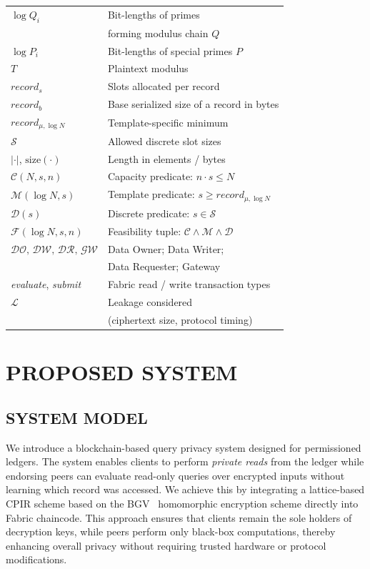 \documentclass[letterpaper,journal]{IEEEtran}
\begin{document}
\begin{table}[!htbp]
\begin{tabular}{|l|l|}
    \hline
    $\log Q_i$ & Bit-lengths of primes \\ & forming modulus chain $Q$ \\
    \hline
    $\log P_i$ & Bit-lengths of special primes $P$ \\
    \hline
    $T$ & Plaintext modulus \\
    \hline
    $record_s$ & Slots allocated per record \\
    \hline
    $record_b$ & Base serialized size of a record in bytes \\
    \hline
    $record_{\mu,\log N}$ & Template-specific minimum \\
    \hline
    $\mathcal{S}$ & Allowed discrete slot sizes \\
    \hline
    $|\cdot|$, $\mathrm{size}(\cdot)$ & Length in elements / bytes \\
    \hline
    $\mathcal{C}(N,s,n)$ & Capacity predicate: $n \cdot s \leq N$ \\
    \hline
    $\mathcal{M}(\log N,s)$ & Template predicate: $s \geq record_{\mu,\log N}$ \\
    \hline
    $\mathcal{D}(s)$ & Discrete predicate: $s \in \mathcal{S}$ \\
    \hline
    $\mathcal{F}(\log N,s,n)$ & Feasibility tuple: $\mathcal{C} \wedge \mathcal{M} \wedge \mathcal{D}$ \\
    \hline
    $\mathcal{DO},\,\mathcal{DW},\,\mathcal{DR},\,\mathcal{GW}$ & Data Owner; Data Writer; \\ & Data Requester; Gateway \\
    \hline
    \emph{evaluate}, \emph{submit} & Fabric read / write transaction types \\
    \hline
    $\mathcal{L}$ & Leakage considered \\ & (ciphertext size, protocol timing) \\
    \hline
    \end{tabular}
\end{table}
    
\section{PROPOSED SYSTEM}\label{sec:proposed_system}
\subsection{SYSTEM MODEL}
We introduce a blockchain-based query privacy system designed for permissioned ledgers. 
The system enables clients to perform \emph{private reads} from the ledger while endorsing peers can evaluate 
read-only queries over encrypted inputs without learning which record was accessed.  
We achieve this by integrating a lattice-based CPIR scheme based on the
BGV~\cite{cryptoeprint:2011/277} homomorphic encryption scheme directly into Fabric chaincode.
This approach ensures that clients remain the sole holders of decryption keys, while peers perform only 
black-box computations, thereby enhancing overall privacy without requiring trusted hardware or protocol modifications.
\end{document}
